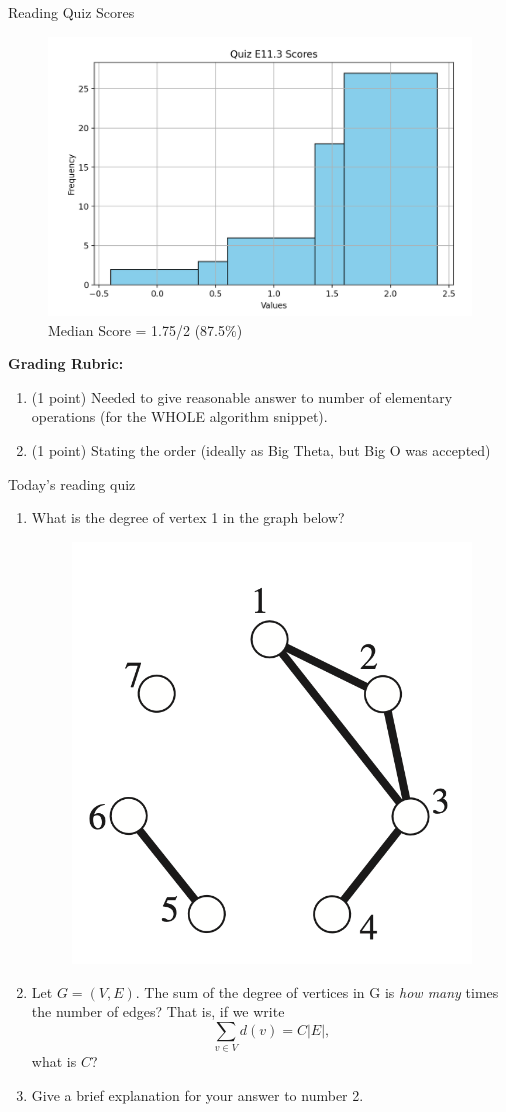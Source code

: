 \documentclass[10pt]{beamer}
\begin{document}
\begin{frame}{Reading Quiz Scores}
\small 
\begin{figure}[ht]
        \centering
        \includegraphics[width=.6\textwidth]{images/reading_quiz_scores}
   		 \caption{Median Score = 1.75/2 (87.5\%)}
\end{figure}
\vfill 
\textbf{Grading Rubric:}  
\begin{enumerate}
\item (1 point) Needed to give  reasonable answer to number of elementary operations (for the WHOLE algorithm snippet).
\item (1 point) Stating the order (ideally as Big Theta, but Big O was accepted)
\end{enumerate}


\end{frame}	




\begin{frame}[standout]
Today's reading quiz
\end{frame}

\begin{frame}
\small 
\begin{myredbox}[title=Reading Quiz (Graph Theory Fundamentals)]

\begin{enumerate}
\item What is the degree of vertex 1 in the graph below?	
\begin{figure}
\includegraphics[width=.4\textwidth]{images/simple_graph.png}	
\end{figure}
\item Let $G=(V,E)$.  The sum of the degree of vertices in G is \textit{how many} times the number of edges? That is, if we write
\[ \sum_{v \in V} d(v) = C|E|, \]
what is $C$?
\item Give a brief explanation for your answer to number 2.
\end{enumerate}


\end{myredbox}
\end{frame}
\end{document}
